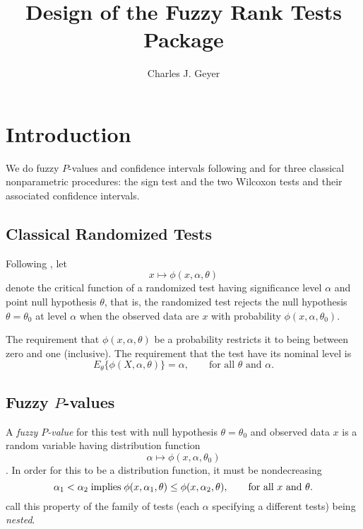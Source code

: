 \documentclass{article}
\begin{document}
\title{Design of the Fuzzy Rank Tests Package}
\author{Charles J. Geyer}
\maketitle

\section{Introduction}

We do fuzzy $P$-values and confidence intervals following
\citet{geyer-meeden} and \citet{thompson-geyer} for three classical
nonparametric procedures: the sign test and the two Wilcoxon tests and
their associated confidence intervals.

\subsection{Classical Randomized Tests}

Following \citet{geyer-meeden}, let
$$
   x \mapsto \phi(x, \alpha, \theta)
$$
denote the critical function of a randomized test having significance level
$\alpha$ and point null hypothesis $\theta$, that is, the randomized test
rejects the null hypothesis $\theta = \theta_0$ at level $\alpha$ when the
observed data are $x$ with probability $\phi(x, \alpha, \theta_0)$.

The requirement that $\phi(x, \alpha, \theta)$ be a probability restricts
it to being between zero and one (inclusive).  The requirement that the
test have its nominal level is
\begin{equation} \label{eq:level}
   E_\theta \{ \phi(X, \alpha, \theta) \} = \alpha,
   \qquad \text{for all $\theta$ and $\alpha$}.
\end{equation}

\subsection{Fuzzy $P$-values}

A \emph{fuzzy $P$-value} for this test with null hypothesis $\theta = \theta_0$
and observed data $x$ is a random variable having distribution function
\begin{equation} \label{eq:fpv-df}
   \alpha \mapsto \phi(x, \alpha, \theta_0)
\end{equation}
\citep[Section~1.4]{geyer-meeden}.  In order for this to be a distribution
function, it must be nondecreasing
\begin{equation} \label{eq:nested}
   \alpha_1 < \alpha_2 \mathrel{\rm implies}
   \phi(x, \alpha_1, \theta) \le \phi(x, \alpha_2, \theta),
   \qquad \text{for all $x$ and $\theta$}.
\end{equation}
\citet{geyer-meeden} call this property of the family of tests
(each $\alpha$ specifying a different tests) being \emph{nested}.
\end{document}
